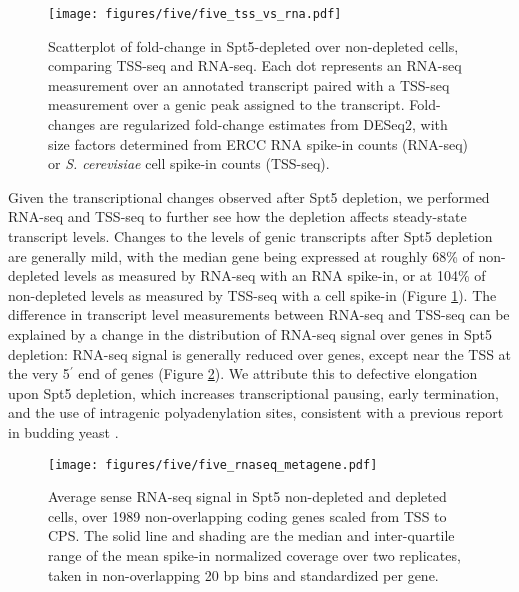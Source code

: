 \begin{figure}[h]
    \centering
    \texttt{[image: figures/five/five\_tss\_vs\_rna.pdf]}
    \caption[Scatterplot of fold-change in Spt5-depleted over non-depleted cells, comparing TSS-seq and RNA-seq.]{Scatterplot of fold-change in Spt5-depleted over non-depleted cells, comparing TSS-seq and RNA-seq. Each dot represents an RNA-seq measurement over an annotated transcript paired with a TSS-seq measurement over a genic peak assigned to the transcript. Fold-changes are regularized fold-change estimates from DESeq2, with size factors determined from ERCC RNA spike-in counts (RNA-seq) or \textit{S. cerevisiae} cell spike-in counts (TSS-seq).}
    \label{fig:five_tss_vs_rna}
\end{figure}
Given the transcriptional changes observed after Spt5 depletion, we performed RNA-seq and TSS-seq to further see how the depletion affects steady-state transcript levels.
Changes to the levels of genic transcripts after Spt5 depletion are generally mild, with the median gene being expressed at roughly 68\% of non-depleted levels as measured by RNA-seq with an RNA spike-in, or at 104\% of non-depleted levels as measured by TSS-seq with a cell spike-in (Figure \ref{fig:five_tss_vs_rna}).
The difference in transcript level measurements between RNA-seq and TSS-seq can be explained by a change in the distribution of RNA-seq signal over genes in Spt5 depletion: RNA-seq signal is generally reduced over genes, except near the TSS at the very 5$^\prime$ end of genes (Figure \ref{fig:five_rnaseq_metagene}).
We attribute this to defective elongation upon Spt5 depletion, which increases transcriptional pausing, early termination, and the use of intragenic polyadenylation sites, consistent with a previous report in budding yeast \citep{cui2003}.
\begin{figure}[h]
    \centering
    \texttt{[image: figures/five/five\_rnaseq\_metagene.pdf]}
    \caption[Average sense RNA-seq signal over non-overlapping coding genes, from Spt5 depleted and non-depleted cells.]{Average sense RNA-seq signal in Spt5 non-depleted and depleted cells, over 1989 non-overlapping coding genes scaled from TSS to CPS. The solid line and shading are the median and inter-quartile range of the mean spike-in normalized coverage over two replicates, taken in non-overlapping 20 bp bins and standardized per gene.}
    \label{fig:five_rnaseq_metagene}
\end{figure}

